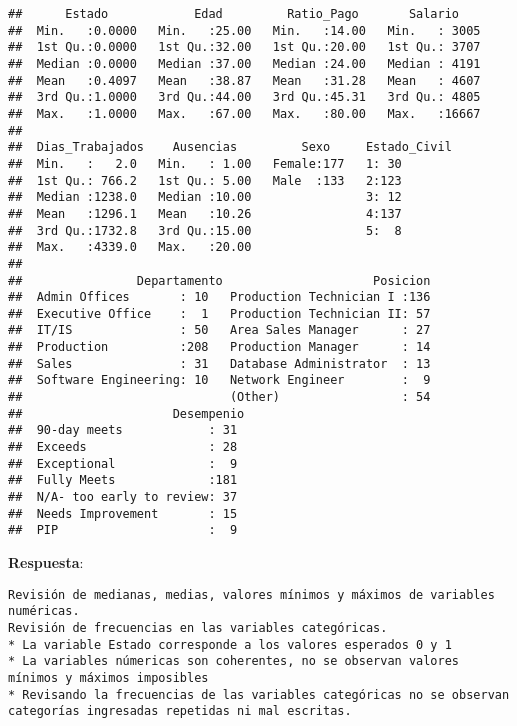 \documentclass[
]{article}
\begin{document}
\begin{verbatim}
##      Estado            Edad         Ratio_Pago       Salario     
##  Min.   :0.0000   Min.   :25.00   Min.   :14.00   Min.   : 3005  
##  1st Qu.:0.0000   1st Qu.:32.00   1st Qu.:20.00   1st Qu.: 3707  
##  Median :0.0000   Median :37.00   Median :24.00   Median : 4191  
##  Mean   :0.4097   Mean   :38.87   Mean   :31.28   Mean   : 4607  
##  3rd Qu.:1.0000   3rd Qu.:44.00   3rd Qu.:45.31   3rd Qu.: 4805  
##  Max.   :1.0000   Max.   :67.00   Max.   :80.00   Max.   :16667  
##                                                                  
##  Dias_Trabajados    Ausencias         Sexo     Estado_Civil
##  Min.   :   2.0   Min.   : 1.00   Female:177   1: 30       
##  1st Qu.: 766.2   1st Qu.: 5.00   Male  :133   2:123       
##  Median :1238.0   Median :10.00                3: 12       
##  Mean   :1296.1   Mean   :10.26                4:137       
##  3rd Qu.:1732.8   3rd Qu.:15.00                5:  8       
##  Max.   :4339.0   Max.   :20.00                            
##                                                            
##                Departamento                     Posicion  
##  Admin Offices       : 10   Production Technician I :136  
##  Executive Office    :  1   Production Technician II: 57  
##  IT/IS               : 50   Area Sales Manager      : 27  
##  Production          :208   Production Manager      : 14  
##  Sales               : 31   Database Administrator  : 13  
##  Software Engineering: 10   Network Engineer        :  9  
##                             (Other)                 : 54  
##                     Desempenio 
##  90-day meets            : 31  
##  Exceeds                 : 28  
##  Exceptional             :  9  
##  Fully Meets             :181  
##  N/A- too early to review: 37  
##  Needs Improvement       : 15  
##  PIP                     :  9
\end{verbatim}

\textbf{Respuesta}:

\begin{verbatim}
Revisión de medianas, medias, valores mínimos y máximos de variables numéricas.
Revisión de frecuencias en las variables categóricas. 
* La variable Estado corresponde a los valores esperados 0 y 1 
* La variables númericas son coherentes, no se observan valores mínimos y máximos imposibles
* Revisando la frecuencias de las variables categóricas no se observan categorías ingresadas repetidas ni mal escritas.
\end{verbatim}
\end{document}
